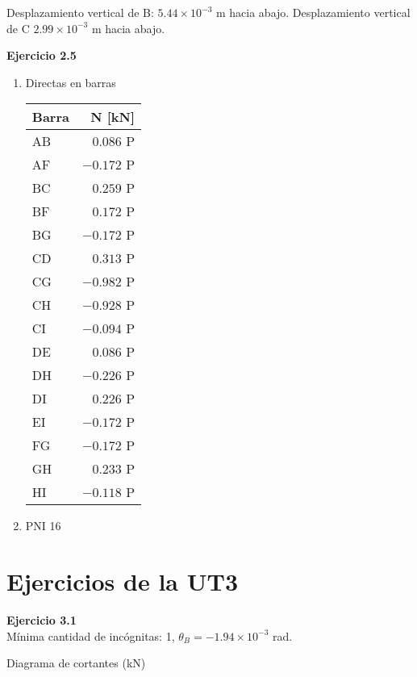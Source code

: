 Desplazamiento vertical de B: $5.44 \times 10^{-3}$ m hacia abajo. Desplazamiento vertical de C $ 2.99 \times 10^{-3}$ m hacia abajo.\newline


\textbf{Ejercicio 2.5}\\

\begin{enumerate}[label=\alph*)]
	\item
Directas en barras

\begin{center}
	\begin{tabular}{lr}
		\hline
		Barra & N [kN] \\
		\hline
AB & $0.086$ P \\
AF & $-0.172$ P \\
BC & $0.259$ P \\
BF & $0.172$ P \\
BG & $-0.172$ P \\
CD & $0.313$ P \\
CG & $-0.982$ P \\
CH & $-0.928$ P \\
CI & $-0.094$ P \\
DE & $0.086$ P \\
DH & $-0.226$ P \\
DI & $0.226$ P \\
EI & $-0.172$ P \\
FG & $-0.172$ P \\
GH & $0.233$ P \\
HI & $-0.118$ P \\
\hline
\end{tabular}
\end{center}

\item PNI 16
\end{enumerate}








\section{Ejercicios de la UT3}

\textbf{Ejercicio 3.1}\\
Mínima cantidad de incógnitas: 1, $\theta_B = -1.94 \times 10^{-3}$ rad.

Diagrama de cortantes (kN)

